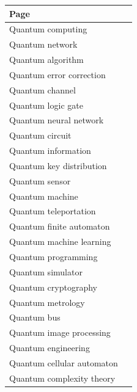 \documentclass[11pt,oneside]{book}
\begin{document}
\begin{longtable}{p{0.92\linewidth}}
\toprule
Page \\
\midrule
\endhead
{}\label{page:quantum-computing}Quantum computing \\
\label{page:quantum-network}Quantum network \\
\label{page:quantum-algorithm}Quantum algorithm \\
\label{page:quantum-error-correction}Quantum error correction \\
\label{page:quantum-channel}Quantum channel \\
\label{page:quantum-logic-gate}Quantum logic gate \\
\label{page:quantum-neural-network}Quantum neural network \\
\label{page:quantum-circuit}Quantum circuit \\
\label{page:quantum-information}Quantum information \\
\label{page:quantum-key-distribution}Quantum key distribution \\
\label{page:quantum-sensor}Quantum sensor \\
\label{page:quantum-machine}Quantum machine \\
\label{page:quantum-teleportation}Quantum teleportation \\
\label{page:quantum-finite-automaton}Quantum finite automaton \\
\label{page:quantum-machine-learning}Quantum machine learning \\
\label{page:quantum-programming}Quantum programming \\
\label{page:quantum-simulator}Quantum simulator \\
\label{page:quantum-cryptography}Quantum cryptography \\
\label{page:quantum-metrology}Quantum metrology \\
\label{page:quantum-bus}Quantum bus \\
\label{page:quantum-image-processing}Quantum image processing \\
\label{page:quantum-engineering}Quantum engineering \\
\label{page:quantum-cellular-automaton}Quantum cellular automaton \\
\label{page:quantum-complexity-theory}Quantum complexity theory \\
\bottomrule
\end{longtable}
\end{document}

